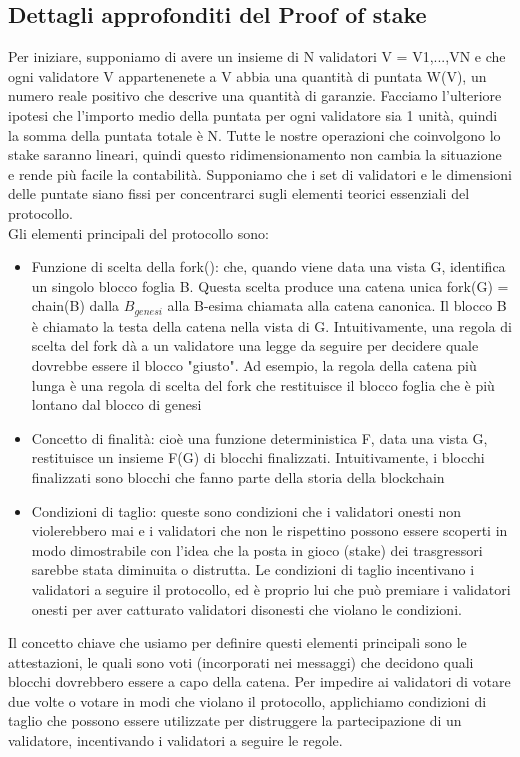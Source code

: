 \documentclass[a4paper,11pt]{report}
\begin{document}
\subsection{Dettagli approfonditi del Proof of stake}
Per iniziare, supponiamo di avere un insieme di N validatori V = {V1,...,VN} e che ogni validatore V appartenenete a  V abbia una quantità di puntata W(V), un numero reale positivo che descrive una quantità di garanzie. Facciamo l'ulteriore ipotesi che l'importo medio della puntata per ogni validatore sia 1 unità, quindi la somma della puntata totale è N. Tutte le nostre operazioni che coinvolgono lo stake saranno lineari, quindi questo ridimensionamento non cambia la situazione e rende più facile la contabilità. Supponiamo che i set di validatori e le dimensioni delle puntate siano fissi per concentrarci sugli elementi teorici essenziali del protocollo.\\
Gli elementi principali del protocollo sono:

\begin{itemize}
\item Funzione di scelta della fork(): che, quando viene data una vista G, identifica un singolo blocco foglia B. Questa scelta produce una catena unica fork(G) = chain(B) dalla $B_{genesi}$  alla B-esima chiamata alla catena canonica. Il blocco B è chiamato la testa della catena nella vista  di G. Intuitivamente, una regola di scelta del fork dà a un validatore una legge da seguire per decidere quale dovrebbe essere il blocco "giusto". Ad esempio, la regola della catena più lunga è una regola di scelta del fork che restituisce il blocco foglia che è più lontano dal blocco di genesi
\item Concetto di finalità: cioè una funzione deterministica F, data una vista G, restituisce un insieme F(G) di  blocchi finalizzati. Intuitivamente, i blocchi finalizzati sono blocchi che fanno parte della storia della blockchain
\item Condizioni di taglio: queste sono condizioni che i validatori onesti non violerebbero mai e i validatori che non le rispettino possono essere scoperti in modo dimostrabile con l'idea che la posta in gioco (stake) dei trasgressori sarebbe stata diminuita o distrutta. Le condizioni di taglio incentivano i validatori a seguire il protocollo, ed è proprio lui che può premiare i validatori onesti per aver catturato validatori disonesti che violano le condizioni.
\end{itemize}

Il concetto chiave che usiamo per definire questi elementi principali sono le attestazioni, le quali sono voti (incorporati nei messaggi) che decidono quali blocchi dovrebbero essere a capo della catena. Per impedire ai validatori di votare due volte o votare in modi che violano il protocollo, applichiamo condizioni di taglio che possono essere utilizzate per distruggere la partecipazione di un validatore, incentivando i validatori a seguire le regole.
\end{document}
